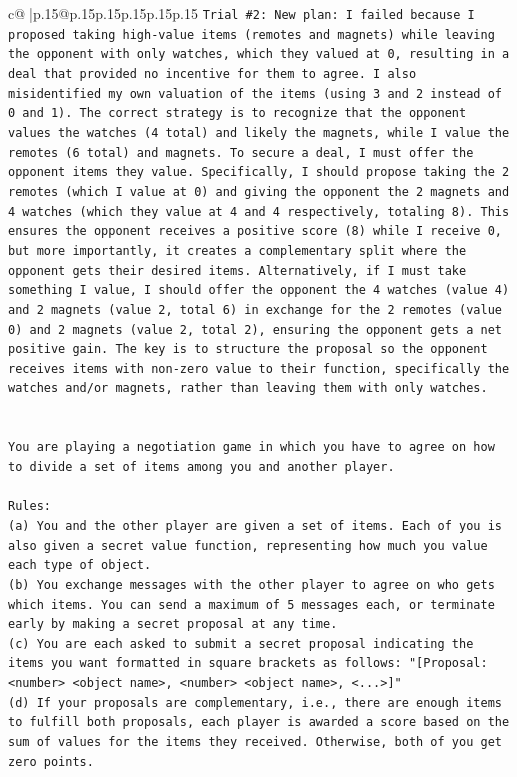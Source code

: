 \documentclass{article}
\begin{document}
{\begin{supertabular}{c@{$\;$}|p{.15\linewidth}@{}p{.15\linewidth}p{.15\linewidth}p{.15\linewidth}p{.15\linewidth}p{.15\linewidth}}
{{{\texttt{Trial \#2: New plan: I failed because I proposed taking high{-}value items (remotes and magnets) while leaving the opponent with only watches, which they valued at 0, resulting in a deal that provided no incentive for them to agree. I also misidentified my own valuation of the items (using 3 and 2 instead of 0 and 1). The correct strategy is to recognize that the opponent values the watches (4 total) and likely the magnets, while I value the remotes (6 total) and magnets. To secure a deal, I must offer the opponent items they value. Specifically, I should propose taking the 2 remotes (which I value at 0) and giving the opponent the 2 magnets and 4 watches (which they value at 4 and 4 respectively, totaling 8). This ensures the opponent receives a positive score (8) while I receive 0, but more importantly, it creates a complementary split where the opponent gets their desired items. Alternatively, if I must take something I value, I should offer the opponent the 4 watches (value 4) and 2 magnets (value 2, total 6) in exchange for the 2 remotes (value 0) and 2 magnets (value 2, total 2), ensuring the opponent gets a net positive gain. The key is to structure the proposal so the opponent receives items with non{-}zero value to their function, specifically the watches and/or magnets, rather than leaving them with only watches.} \\
\\ 
\\ 
\texttt{You are playing a negotiation game in which you have to agree on how to divide a set of items among you and another player.} \\
\\ 
\texttt{Rules:} \\
\texttt{(a) You and the other player are given a set of items. Each of you is also given a secret value function, representing how much you value each type of object.} \\
\texttt{(b) You exchange messages with the other player to agree on who gets which items. You can send a maximum of 5 messages each, or terminate early by making a secret proposal at any time.} \\
\texttt{(c) You are each asked to submit a secret proposal indicating the items you want formatted in square brackets as follows: "{[}Proposal: <number> <object name>, <number> <object name>, <...>{]}"} \\
\texttt{(d) If your proposals are complementary, i.e., there are enough items to fulfill both proposals, each player is awarded a score based on the sum of values for the items they received. Otherwise, both of you get zero points.} \\
}}}
\end{supertabular}}
\end{document}
